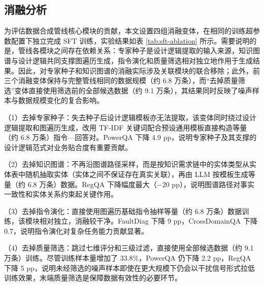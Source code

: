 \documentclass[fontset=fandol,type=master,campus=shenzhen,etitleauto=true]{hithesisbook}
\begin{document}
\subsection{消融分析}\label{ux6d88ux878dux5206ux6790}

为评估数据合成管线核心模块的贡献，本文设置四组消融变体，在相同的训练超参数配置下独立完成 SFT 训练，实验结果如表 \ref{tab:sft-ablation} 所示。需要说明的是，管线各模块之间存在依赖关系：专家种子是设计逻辑提取的输入来源，知识图谱与设计逻辑共同支撑图遍历生成，指令演化和质量筛选相对独立地作用于生成结果。因此，对专家种子和知识图谱的消融实际涉及关联模块的联合移除；此外，前三个消融变体保持与完整管线相同的数据规模（约 6.8 万条），而``去掉质量筛选''变体直接使用筛选前的全部候选数据（约 9.1 万条），其结果同时反映了噪声样本与数据规模变化的复合影响。

（1）去掉专家种子：失去种子后设计逻辑模板亦无法提取，该变体同时绕过设计逻辑提取和图遍历生成，改用 TF-IDF 关键词配合预设通用模板直接构造等量（约 6.8 万条）指令---回答对。PowerQA 下降 4.9 pp，说明专家种子及其支撑的设计逻辑范式对业务贴合度有重要贡献。

（2）去掉知识图谱：不再沿图谱路径采样，而是按知识需求链中的实体类型从实体表中随机抽取实体（实体之间不保证存在真实关联），再由 LLM 按模板生成等量（约 6.8 万条）数据。RegQA 下降幅度最大（$-20$ pp），说明图谱路径对事实一致性和实体关系约束起关键作用。

（3）去掉指令演化：直接使用图遍历基础指令抽样等量（约 6.8 万条）数据训练，该模块相对独立，消融较干净。FaultDiag 下降 9 pp，CrossDomainQA 下降 0.7，说明指令演化对复杂任务能力贡献显著。

（4）去掉质量筛选：跳过七维评分和三级过滤，直接使用全部候选数据（约 9.1 万条）训练。尽管训练样本量增加了 33.8\%，PowerQA 仍下降 2.2 pp，RegQA 下降 5 pp，说明未经筛选的噪声样本即使在更大规模下仍会以干扰信号形式拉低训练效果，末端质量筛选是保障数据有效性的必要环节。

\begin{table}[htbp]
\centering
\caption{SFT数据合成管线消融实验结果}
\label{tab:sft-ablation}
\small
{}
\end{table}
\end{document}
